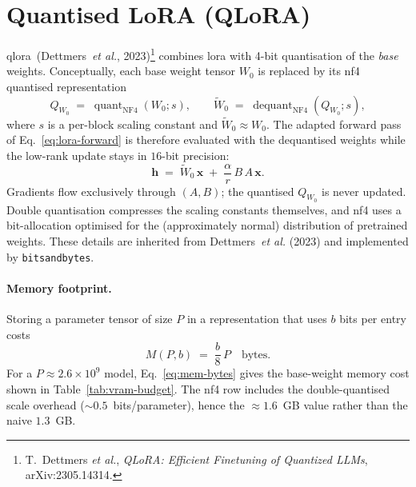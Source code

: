 \documentclass[12pt, a4paper]{report}
\begin{document}
\section{Quantised LoRA (QLoRA)}
\label{sec:qlora}

\gls{qlora}~(Dettmers~\emph{et al.}, 2023)\footnote{T.~Dettmers \emph{et al.},
\emph{QLoRA: Efficient Finetuning of Quantized LLMs}, arXiv:2305.14314.}
combines \gls{lora} with 4-bit quantisation of the \emph{base} weights.
Conceptually, each base weight tensor \(W_0\) is replaced by its
\gls{nf4} quantised representation
\begin{equation}
  Q_{W_0} \;=\; \operatorname{quant}_{\mathrm{NF4}}(W_0; s),
  \qquad
  \widetilde{W}_0 \;=\; \operatorname{dequant}_{\mathrm{NF4}}(Q_{W_0}; s),
  \label{eq:nf4}
\end{equation}
where \(s\) is a per-block scaling constant and
\(\widetilde{W}_0 \approx W_0\). The adapted forward pass of
Eq.~\eqref{eq:lora-forward} is therefore evaluated with the dequantised
weights while the low-rank update stays in \(16\)-bit precision:
\begin{equation}
  \bm{h} \;=\; \widetilde{W}_0\,\bm{x} \;+\; \frac{\alpha}{r}\,B\,A\,\bm{x}.
  \label{eq:qlora-forward}
\end{equation}
Gradients flow exclusively through \((A, B)\); the quantised
\(Q_{W_0}\) is never updated. Double quantisation compresses the scaling
constants themselves, and \gls{nf4} uses a bit-allocation optimised for
the (approximately normal) distribution of pretrained weights. These
details are inherited from Dettmers~\emph{et al.} (2023) and
implemented by \texttt{bitsandbytes}.

\paragraph{Memory footprint.} Storing a parameter tensor of size \(P\) in
a representation that uses \(b\) bits per entry costs
\begin{equation}
  M(P, b) \;=\; \frac{b}{8}\,P \quad \text{bytes}.
  \label{eq:mem-bytes}
\end{equation}
For a \(P \approx 2.6 \times 10^{9}\) model, Eq.~\eqref{eq:mem-bytes}
gives the base-weight memory cost shown in
Table~\ref{tab:vram-budget}. The \gls{nf4} row includes the
double-quantised scale overhead ($\sim 0.5$~bits/parameter), hence the
\(\approx 1.6\)~GB value rather than the naive \(1.3\)~GB.
\end{document}
